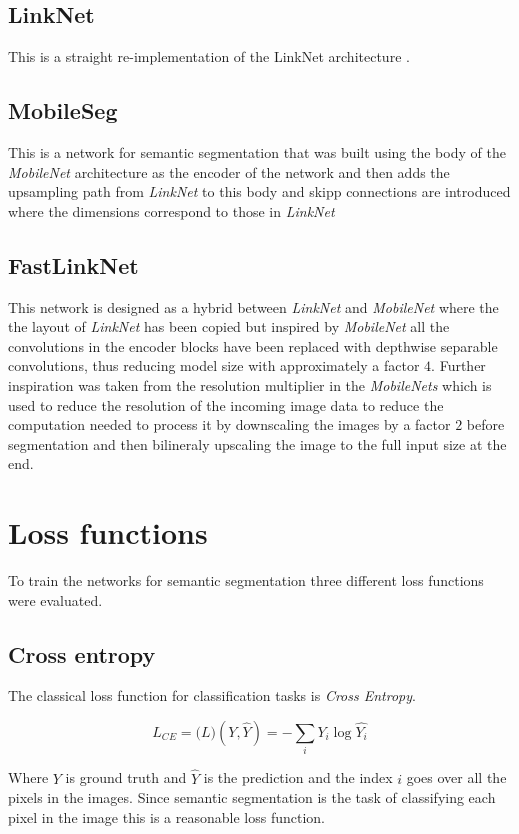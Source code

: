 \documentclass{kththesis}
\begin{document}
\subsection{LinkNet}
This is a straight re-implementation of the LinkNet architecture \parencite{chaurasia2017linknet}.

\subsection{MobileSeg}
This is a network for semantic segmentation that was built using the body of the
\textit{MobileNet} architecture \parencite{howard2017mobilenets} as the encoder of the network and then adds the
upsampling path from \textit{LinkNet} to this body and skipp connections are
introduced where the dimensions correspond to those in \textit{LinkNet}

\subsection{FastLinkNet}
This network is designed as a hybrid between \textit{LinkNet} and
\textit{MobileNet} where the the layout of \textit{LinkNet} has been copied but
inspired by \textit{MobileNet} all the convolutions in the encoder blocks have
been replaced with depthwise separable convolutions, thus reducing model size
with approximately a factor \(4\).
Further inspiration was taken from the resolution
multiplier in the \textit{MobileNets} which is used to reduce the resolution of
the incoming image data to reduce the computation needed to process it by
downscaling the images by a factor \(2\) before segmentation and then bilineraly
upscaling the image to the full input size at the end.

\section{Loss functions}
To train the networks for semantic segmentation three different loss functions
were evaluated.

\subsection{Cross entropy}\label{section:cross_entropy}
The classical loss function for classification tasks is
\textit{Cross Entropy}.

\[L_{CE} = \mathcal(L)(Y, \hat{Y}) =- \sum_i Y_i \log\hat{Y_i}\]

Where \(Y\) is ground truth and \(\hat{Y}\) is the prediction and the index
\(i\) goes over all the pixels in the images. Since
semantic segmentation is the task of classifying each pixel in the image this is
a reasonable loss function.
\end{document}

